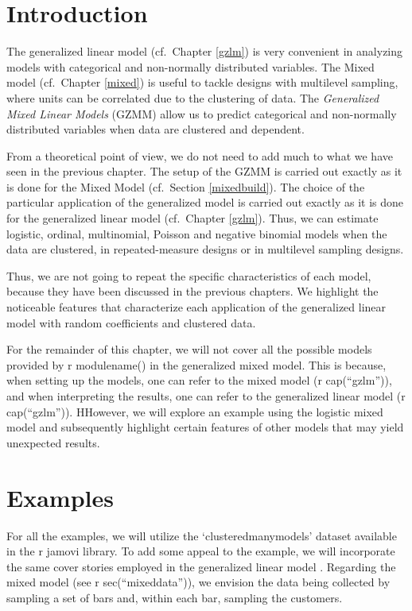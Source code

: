 \documentclass[
]{book}
\begin{document}
\hypertarget{introduction-2}{%
\section{Introduction}\label{introduction-2}}

The generalized linear model (cf.~Chapter \ref{gzlm}) is very convenient in analyzing models with categorical and non-normally distributed variables. The Mixed model (cf.~Chapter \ref{mixed}) is useful to tackle designs with multilevel sampling, where units can be correlated due to the clustering of data. The \emph{Generalized Mixed Linear Models} (GZMM) allow us to predict categorical and non-normally distributed variables when data are clustered and dependent.

From a theoretical point of view, we do not need to add much to what we have seen in the previous chapter. The setup of the GZMM is carried out exactly as it is done for the Mixed Model (cf.~Section \ref{mixedbuild}). The choice of the particular application of the generalized model is carried out exactly as it is done for the generalized linear model (cf.~Chapter \ref{gzlm}). Thus, we can estimate logistic, ordinal, multinomial, Poisson and negative binomial models when the data are clustered, in repeated-measure designs or in multilevel sampling designs.

Thus, we are not going to repeat the specific characteristics of each model, because they have been discussed in the previous chapters. We highlight the noticeable features that characterize each application of the generalized linear model with random coefficients and clustered data.

For the remainder of this chapter, we will not cover all the possible models provided by r modulename() in the generalized mixed model. This is because, when setting up the models, one can refer to the mixed model (r cap(``gzlm'')), and when interpreting the results, one can refer to the generalized linear model (r cap(``gzlm'')). HHowever, we will explore an example using the logistic mixed model and subsequently highlight certain features of other models that may yield unexpected results.

\hypertarget{examples}{%
\section{Examples}\label{examples}}

For all the examples, we will utilize the `clusteredmanymodels' dataset available in the r jamovi library. To add some appeal to the example, we will incorporate the same cover stories employed in the generalized linear model . Regarding the mixed model (see r sec(``mixeddata'')), we envision the data being collected by sampling a set of bars and, within each bar, sampling the customers.
\end{document}
